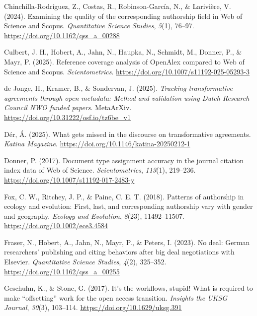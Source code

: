 \documentclass[a4paper,man,floatsintext,longtable,noextraspace,10pt]{apa6}
\newlength{\cslhangindent}
\newenvironment{CSLReferences}[2] %
{\begin{list}{}{%
  \setlength{\itemindent}{0pt}
  \setlength{\leftmargin}{0pt}
  \setlength{\parsep}{0pt}
  \ifodd #1
  \setlength{\leftmargin}{\cslhangindent}
  \setlength{\itemindent}{-1\cslhangindent}
  \fi
  \setlength{\itemsep}{#2\baselineskip}}}
{\end{list}}
\begin{document}
\begin{CSLReferences}{1}{0}
Chinchilla-Rodríguez, Z., Costas, R., Robinson-García, N., \& Larivière,
V. (2024). Examining the quality of the corresponding authorship field
in {Web of Science} and {Scopus}. \emph{Quantitative Science Studies},
\emph{5}(1), 76--97. \url{https://doi.org/10.1162/qss_a_00288}

Culbert, J. H., Hobert, A., Jahn, N., Haupka, N., Schmidt, M., Donner,
P., \& Mayr, P. (2025). Reference coverage analysis of {OpenAlex}
compared to {Web of Science} and {Scopus}. \emph{Scientometrics}.
\url{https://doi.org/10.1007/s11192-025-05293-3}

de Jonge, H., Kramer, B., \& Sondervan, J. (2025). \emph{Tracking
transformative agreements through open metadata: Method and validation
using {Dutch Research Council NWO} funded papers}. MetaArXiv.
\url{https://doi.org/10.31222/osf.io/tz6be_v1}

Dér, Á. (2025). What gets missed in the discourse on transformative
agreements. \emph{Katina Magazine}.
\url{https://doi.org/10.1146/katina-20250212-1}

Donner, P. (2017). Document type assignment accuracy in the journal
citation index data of {Web of Science}. \emph{Scientometrics},
\emph{113}(1), 219--236. \url{https://doi.org/10.1007/s11192-017-2483-y}

Fox, C. W., Ritchey, J. P., \& Paine, C. E. T. (2018). Patterns of
authorship in ecology and evolution: First, last, and corresponding
authorship vary with gender and geography. \emph{Ecology and Evolution},
\emph{8}(23), 11492--11507. \url{https://doi.org/10.1002/ece3.4584}

Fraser, N., Hobert, A., Jahn, N., Mayr, P., \& Peters, I. (2023). No
deal: German researchers' publishing and citing behaviors after big deal
negotiations with {Elsevier}. \emph{Quantitative Science Studies},
\emph{4}(2), 325--352. \url{https://doi.org/10.1162/qss_a_00255}

Geschuhn, K., \& Stone, G. (2017). It's the workflows, stupid! What is
required to make {``offsetting''} work for the open access transition.
\emph{Insights the {UKSG} Journal}, \emph{30}(3), 103--114.
\url{https://doi.org/10.1629/uksg.391}


\end{CSLReferences}
\end{document}
